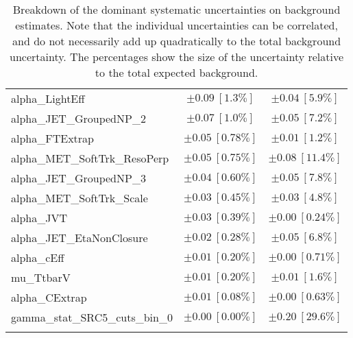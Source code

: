 \begin{table}
\begin{center}
\begin{tabular*}{\textwidth}{@{\extracolsep{\fill}}lcc}
alpha\_LightEff         & $\pm 0.09\ [1.3\%] $          & $\pm 0.04\ [5.9\%] $       \\
alpha\_JET\_GroupedNP\_2         & $\pm 0.07\ [1.0\%] $          & $\pm 0.05\ [7.2\%] $       \\
alpha\_FTExtrap         & $\pm 0.05\ [0.78\%] $          & $\pm 0.01\ [1.2\%] $       \\
alpha\_MET\_SoftTrk\_ResoPerp         & $\pm 0.05\ [0.75\%] $          & $\pm 0.08\ [11.4\%] $       \\
alpha\_JET\_GroupedNP\_3         & $\pm 0.04\ [0.60\%] $          & $\pm 0.05\ [7.8\%] $       \\
alpha\_MET\_SoftTrk\_Scale         & $\pm 0.03\ [0.45\%] $          & $\pm 0.03\ [4.8\%] $       \\
alpha\_JVT         & $\pm 0.03\ [0.39\%] $          & $\pm 0.00\ [0.24\%] $       \\
alpha\_JET\_EtaNonClosure         & $\pm 0.02\ [0.28\%] $          & $\pm 0.05\ [6.8\%] $       \\
alpha\_cEff         & $\pm 0.01\ [0.20\%] $          & $\pm 0.00\ [0.71\%] $       \\
mu\_TtbarV         & $\pm 0.01\ [0.20\%] $          & $\pm 0.01\ [1.6\%] $       \\
alpha\_CExtrap         & $\pm 0.01\ [0.08\%] $          & $\pm 0.00\ [0.63\%] $       \\
gamma\_stat\_SRC5\_cuts\_bin\_0         & $\pm 0.00\ [0.00\%] $          & $\pm 0.20\ [29.6\%] $       \\
\noalign{\smallskip}\hline\noalign{\smallskip}
\end{tabular*}
\end{center}
\caption[Breakdown of uncertainty on background estimates]{
Breakdown of the dominant systematic uncertainties on background estimates.
Note that the individual uncertainties can be correlated, and do not necessarily add up quadratically to 
the total background uncertainty. The percentages show the size of the uncertainty relative to the total expected background.
\label{table.results.bkgestimate.uncertainties.SRC4_SRC5}}
\end{table}
%